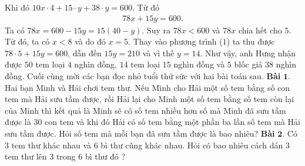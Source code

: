 \begin{multicols}{2}
	\vskip 0.1cm
	Khi đó  $10x \cdot 4 +15\cdot y +38\cdot y =600$. Từ đó 
	\begin{align*}
		78x + 15y = 600. \tag{$1$}
	\end{align*}
	Ta có  $78x = 600 - 15y = 15(40-y)$. Suy ra $78x < 600$  và $78x$ chia hết cho $5$. Từ đó, ta có  $x < 8$ và do đó $x = 5$. Thay vào phương trình ($1$) ta thu được $78 \cdot 5 + 15y = 600$, dẫn đến $15y = 210$ và vì thế $y = 14$.
	\vskip 0.1cm
	Như vậy, anh Hưng nhận được $50$ tem loại $4$ nghìn đồng, $14$ tem loại $15$ nghìn đồng và $5$ blốc giá $38$ nghìn đồng.
	\vskip 0.1cm
	Cuối cùng mời các bạn đọc nhỏ tuổi thử sức với hai bài toán sau.
	\vskip 0.1cm
	\textbf{\color{toancuabi}Bài} $\pmb{1.}$ Hai bạn Minh và Hải chơi tem thư. Nếu Minh cho Hải một số tem bằng số con tem mà Hải sưu tầm được, rồi Hải lại cho Minh một số tem bằng số tem còn lại của Minh thì kết quả là Minh sẽ có số tem nhiều hơn số mà Minh đã sưu tầm được là $30$ con tem và khi đó Hải có số tem bằng một phần ba lần số tem mà Hải sưu tầm được. Hỏi số tem mà mỗi bạn đã sưu tầm được là bao nhiêu?
	\vskip 0.1cm
	\textbf{\color{toancuabi}Bài} $\pmb{2.}$ Có $3$ tem thư khác nhau và $6$ bì thư cũng khác nhau. Hỏi có bao nhiêu cách dán $3$ tem thư lên $3$ trong $6$ bì thư đó ?
\end{multicols}
\newpage
\begingroup
{} 
